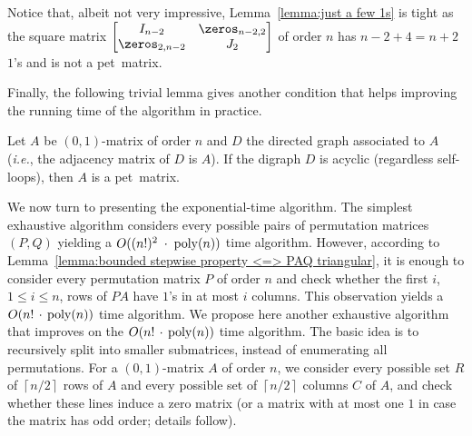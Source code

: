 \documentclass[a4paper,10pt]{llncs}
\newcommand{\PET}{pet}
\begin{document}
Notice that, albeit not very impressive, 
Lemma~\ref{lemma:just a few 1s} is tight as the square matrix
$\begin{bmatrix}
I_{n-2} & \zeros_{n-2,2} \\
\zeros_{2,n-2} & J_{2}
\end{bmatrix}$
of order $n$ has $n-2+4 = n + 2$ $1$'s and is not a \PET\ matrix.

Finally, the following trivial lemma gives another condition
that helps improving the running time of the algorithm in practice.

\begin{lemma}
  \label{lemma:acyclic}
  Let $A$ be $(0,1)$-matrix of order $n$
  and $D$ the directed graph associated to $A$
  (\emph{i.e.}, the adjacency matrix of $D$ is $A$).
  If the digraph $D$ is acyclic (regardless self-loops),
  then $A$ is a \PET\ matrix.
\end{lemma}

We now turn to presenting the exponential-time algorithm.
The simplest exhaustive algorithm considers every possible pairs
of permutation matrices $(P, Q)$ yielding a $O((n!)^2 \;\cdot\; \operatorname{poly}(n))$ time
algorithm.
However, according to 
Lemma~\ref{lemma:bounded stepwise property <=> PAQ triangular},
it is enough to consider every permutation matrix $P$ of order $n$
and check whether the first $i$, $1 \leq i \leq n$, rows of $PA$
have $1$'s in at most $i$ columns.
This observation yields a $O(n! \,\cdot\, \operatorname{poly}(n))$ time algorithm.
We propose here another exhaustive algorithm that improves on the
$O(n! \,\cdot\, \operatorname{poly}(n))$ time algorithm. 
The basic idea is to recursively split into smaller submatrices, 
instead of enumerating all permutations.
For a $(0,1)$-matrix $A$ of order $n$, we consider every possible set $R$
of $\left\lceil n/2 \right\rceil$ rows of $A$ and 
every possible set of $\left\lceil n/2 \right\rceil$ columns $C$ of $A$,
and check whether these lines induce a zero matrix
(or a matrix with at most one $1$ in case the matrix has odd order; 
details follow).
\end{document}
